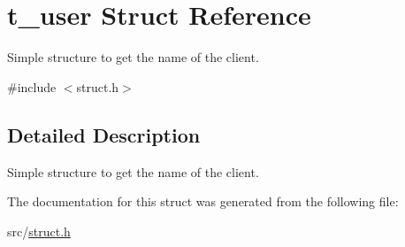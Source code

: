 \hypertarget{structt__user}{}\section{t\+\_\+user Struct Reference}
\label{structt__user}


Simple structure to get the name of the client.  




{\ttfamily \#include $<$struct.\+h$>$}



\subsection{Detailed Description}
Simple structure to get the name of the client. 

The documentation for this struct was generated from the following file\+:\begin{DoxyCompactItemize}
\item 
src/\hyperlink{struct_8h}{struct.\+h}\end{DoxyCompactItemize}
